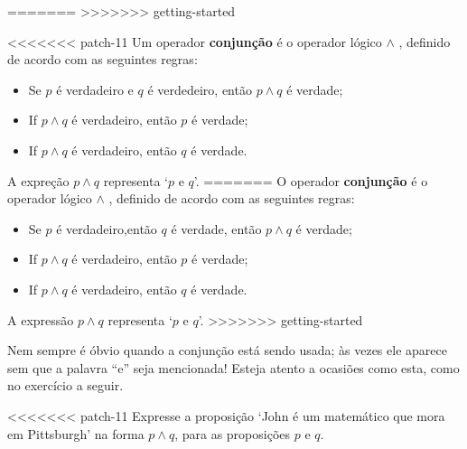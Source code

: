 =======
>>>>>>> getting-started
\begin{idefinition}
\label{defConjunction}
<<<<<<< patch-11
Um operador \textbf{conjunção} é o operador lógico $\wedge$ , definido de acordo com as seguintes regras:
\begin{itemize}
\item \introrule{\wedge} Se $p$ é verdadeiro e $q$ é verdedeiro, então $p \wedge q$ é verdade;
\item {} If $p \wedge q$ é verdadeiro, então $p$ é verdade;
\item {} If $p \wedge q$ é verdadeiro, então $q$ é verdade.
\end{itemize}
A expreção $p \wedge q$ representa `$p$ e $q$'.
=======
O operador \textbf{conjunção} é o operador lógico $\wedge$ , definido de acordo com as seguintes regras:
\begin{itemize}
\item \introrule{\wedge} Se $p$ é verdadeiro,então $q$ é verdade, então $p \wedge q$ é verdade;
\item {} If $p \wedge q$ é verdadeiro, então $p$ é verdade;
\item {} If $p \wedge q$ é verdadeiro, então $q$ é verdade.
\end{itemize}
A expressão $p \wedge q$ representa `$p$ e $q$'.
>>>>>>> getting-started
\end{idefinition}

Nem sempre é óbvio quando a conjunção está sendo usada; às vezes ele aparece sem que a palavra “e” seja mencionada! Esteja atento a ocasiões como esta, como no exercício a seguir.


\begin{exercise}
\label{exJohnMathematicianPittsburgh}
<<<<<<< patch-11
Expresse a proposição `John é um matemático que mora em Pittsburgh' na forma $p \wedge q$, para as proposições $p$ e $q$.
\end{exercise}

